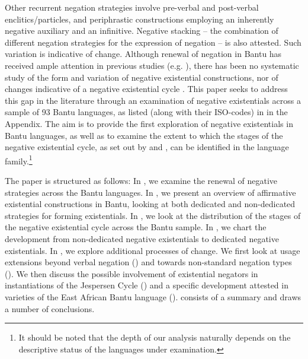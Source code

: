 \documentclass[output=paper]{langscibook}
\begin{document}
Other recurrent negation strategies involve pre-verbal and post-verbal
enclitics/particles, and periphrastic constructions employing an inherently
negative auxiliary and an infinitive. Negative stacking -- the combination
of different negation strategies for the expression of negation -- is also
attested. Such variation is indicative of change. Although renewal of
negation in Bantu has received ample attention in previous studies (e.g.
\citealt{KambaMuzenga1981,Guldemann1996,Guldemann1999,DevosAuwera2013,DevosOlmen2013}), there has been no systematic study of the
form and variation of negative existential constructions, nor of changes
indicative of a negative existential cycle
\parencites{Croft1991}{Veselinova2016}. This paper seeks
to address this gap in the literature through an examination of negative
existentials across a sample of 93 Bantu languages, as listed (along with
their ISO-codes) in  in the Appendix. The aim is to provide
the first exploration of negative existentials in Bantu languages, as well
as to examine the extent to which the stages of the negative existential
cycle, as set out by \citet{Croft1991} and
\citet{Veselinova2016}, can be identified in the
language family.\footnote{It should be noted that the depth of our analysis
naturally depends on the descriptive status of the languages under
examination.}

The paper is structured as follows: In ,
 we examine the renewal of negative strategies across the Bantu languages.
 In , we present an overview of affirmative existential
 constructions in Bantu, looking at both dedicated and non-dedicated
 strategies for forming existentials. In , we look at the
 distribution of the stages of the negative existential cycle across the
 Bantu sample. In , we chart the development from
 non-dedicated negative existentials to dedicated negative existentials. In
 , we explore additional processes of change. We first
 look at usage extensions beyond verbal negation () and
 towards non-standard negation types (). We then discuss the possible involvement of existential negators in instantiations of the Jespersen Cycle () and a specific development attested in varieties of the East African Bantu language  ().  consists of a summary and draws a number of conclusions.
\end{document}
